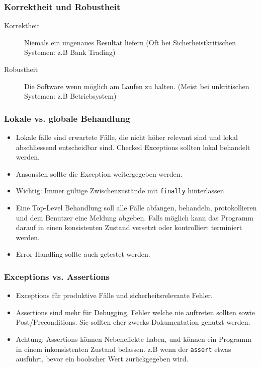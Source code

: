 \subsubsection{Korrektheit und Robustheit}
\begin{description}
	\item[Korrektheit] Niemals ein ungenaues Resultat liefern (Oft bei Sicherheistkritischen Systemen: z.B Bank Trading)
	\item[Robustheit] Die Software wenn möglich am Laufen zu halten. (Meist bei unkritischen Systemen: z.B Betriebsystem)
\end{description}

\subsubsection{Lokale vs. globale Behandlung}
\begin{itemize}
	\item Lokale fälle sind erwartete Fälle, die nicht höher relevant sind und lokal abschliessend entscheidbar sind. Checked Exceptions sollten lokal behandelt werden.
	\item Ansonsten sollte die Exception weitergegeben werden.
	\item Wichtig: Immer gültige Zwischenzustände mit \lstinline|finally| hinterlassen
	\item Eine Top-Level Behandlung soll alle Fälle abfangen, behandeln, protokollieren und dem Benutzer eine Meldung abgeben. Falls möglich kann das Programm darauf in einen konsistenten Zustand versetzt oder kontrolliert terminiert werden.
	\item Error Handling sollte auch getestet werden.
\end{itemize}

\subsubsection{Exceptions vs. Assertions}

\begin{itemize}
	\item Exceptions für produktive Fälle und sicherheitsrelevante Fehler.
	\item Assertions sind mehr für Debugging, Fehler welche nie auftreten sollten sowie Post/Preconditions. Sie sollten eher zwecks Dokumentation genutzt werden.
	\item Achtung: Assertions können Nebeneffekte haben, und können ein Programm in einem inkonsistenten Zustand belassen. z.B wenn der \lstinline|assert| etwas ausführt, bevor ein boolscher Wert zurückgegeben wird.
\end{itemize}


